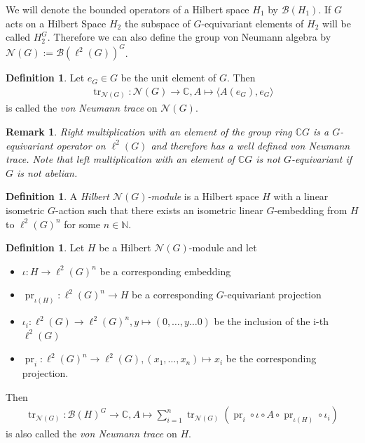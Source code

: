 \documentclass[12pt,a4paper]{scrartcl}
\theoremstyle{plain}
\newtheorem{Remark}[Theorem]{Remark}
\theoremstyle{definition}
\newtheorem{Definition}[Theorem]{Definition}
\newcommand{\C}{\mathbb{C}} %
\newcommand{\N}{\mathbb{N}} %
\newcommand{\2}{\mathbb{Z} / 2 \mathbb{Z}}
\newcommand{\1}{\bar{1}}
\newcommand{\0}{\bar{0}}
\newcommand{\tr}{\operatorname{tr}}
\newcommand{\pr}{\operatorname{pr}}
\begin{document}
We will denote the bounded operators of a Hilbert space $H_1$ by $\mathcal{B}(H_1)$. If $G$ acts on a Hilbert Space $H_2$ the subspace of $G$-equivariant elements of $H_2$ will be called $H_2^G$. Therefore we can also define the group von Neumann algebra by $\mathcal{N}(G) := \mathcal{B}(\ell^2(G))^G$.
\begin{Definition}
	Let $e_G \in G$ be the unit element of $G$. Then
	\begin{align*}
		\tr_{\mathcal{N}(G)}\colon \mathcal{N}(G) \to \C, A  \mapsto \langle A( e_G), e_G \rangle
	\end{align*}
	is called the \emph{von Neumann trace} on $\mathcal{N}(G)$.
\end{Definition}
\begin{Remark}
	Right multiplication with an element of the group ring $\C G$ is a $G$-equivariant operator on $\ell^2(G)$ and therefore has a well defined von Neumann trace. Note that left multiplication with an element of $\C G$ is not $G$-equivariant if $G$ is not abelian.
\end{Remark}
\begin{Definition}
	A \emph{Hilbert $\mathcal{N}(G)$-module} is a Hilbert space $H$ with a linear isometric $G$-action such that there exists an isometric linear $G$-embedding from $H$ to $\ell^2(G)^n$ for some $n \in \N$.
\end{Definition}
\begin{Definition}
	Let $H$ be a Hilbert $\mathcal{N}(G)$-module and let 
	\begin{itemize}
		\item $\iota\colon H \to \ell^2(G)^n$ be a corresponding embedding 
		\item $\pr_{\iota(H)}\colon \ell^2(G)^n \to H$ be a corresponding $G$-equivariant projection
		\item $\iota_i\colon \ell^2(G) \to \ell^2(G)^n, y \mapsto (0, \ldots, y \ldots 0)$ be the inclusion of the i-th $\ell^2(G)$
		\item $\pr_i\colon \ell^2(G)^n \to \ell^2(G), (x_1, \ldots, x_n) \mapsto x_i$  be the corresponding projection.
	\end{itemize}
	Then 
	\begin{align*}
		\tr_{\mathcal{N}(G)}\colon \mathcal{B}(H)^G \to \C, A \mapsto \sum_{i = 1}^{n} \tr_{\mathcal{N}(G)}(\pr_i \circ \iota \circ A \circ \pr_{\iota(H)} \circ \iota_i)
	\end{align*}
	is also called the \emph{von Neumann trace} on $H$.
\end{Definition}
\end{document}
